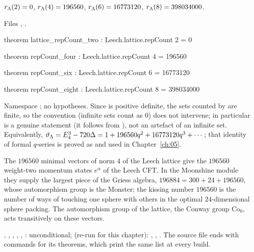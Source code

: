 \begin{theorem}\label{ch02:thm:196560}
$r_{\Lambda}(2)=0$, $r_{\Lambda}(4)=196560$, $r_{\Lambda}(6)=16773120$, $r_{\Lambda}(8)=398034000$.
\end{theorem}
\noindent Files , .
\begin{leancode}
theorem lattice_repCount_two : Leech.lattice.repCount 2 = 0

theorem repCount_four : Leech.lattice.repCount 4 = 196560

theorem repCount_six : Leech.lattice.repCount 6 = 16773120

theorem repCount_eight : Leech.lattice.repCount 8 = 398034000
\end{leancode}
\begin{dictionary}
Namespace ; no hypotheses.  Since  is positive definite, the sets
counted by  are finite, so the  convention (infinite sets count as $0$)
does not intervene; in particular  is a genuine statement (it follows
from ), not an artefact of an infinite set.  Equivalently,
$\vartheta_{\Lambda}=E_4^3-720\Delta=1+196560q^2+16773120q^3+\cdots$; that identity of formal
$q$-series is proved as  and used in
Chapter~\ref{ch:05}.
\end{dictionary}
\begin{physics}
The $196560$ minimal vectors of norm $4$ of the Leech lattice give the $196560$ weight-two momentum states $e^{\alpha}$ of the Leech CFT. In the Moonshine module they supply the largest piece of the Griess algebra, $196884=300+24+196560$, whose automorphism group is the Monster; the kissing number $196560$ is the number of ways of touching one sphere with others in the optimal $24$-dimensional sphere packing. The automorphism group of the lattice, the Conway group $\mathrm{Co}_0$, acts transitively on these vectors.
\end{physics}
\begin{status}
, , ,
, ,
: unconditional; 
(re-run for this chapter): , , .  The source
file  ends with  commands for its theorems,
which print the same list at every build.
\end{status}

